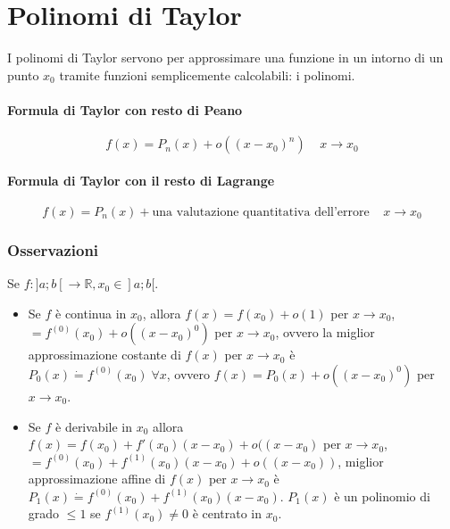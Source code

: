 \chapter{Polinomi di Taylor}
I polinomi di Taylor servono per approssimare una funzione in un intorno di un punto $x_0$ tramite funzioni semplicemente calcolabili: i polinomi.
\subsubsection{Formula di Taylor con resto di Peano}
\begin{equation}
f(x)=P_n(x)+o((x-x_0)^n)\;\;\;\;x\rightarrow x_0
\end{equation}
\subsubsection{Formula di Taylor con il resto di Lagrange}
\begin{equation}
f(x)=P_n(x)+\text{una valutazione quantitativa dell'errore}\;\;\;\;x\rightarrow x_0
\end{equation}
\subsection{Osservazioni}
Se $f:]a;b[\rightarrow\mathbb{R}, x_0\in]a;b[$.
\begin{itemize}
\item Se $f$ \`e continua in $x_0$, allora $f(x)=f(x_0)+o(1)$ per $x\rightarrow x_0$,\\
$=f^{(0)}(x_0)+o((x-x_0)^0)$ per $x\rightarrow x_0$, ovvero la miglior approssimazione costante di $f(x)$ per $x\rightarrow x_0$ \`e\\
$P_0(x)\dot{=}f^{(0)}(x_0)\;\forall x$, ovvero $f(x)=P_0(x)+o((x-x_0)^0)$ per $x\rightarrow x_0$.
\item Se $f$ \`e derivabile in $x_0$ allora $f(x)=f(x_0)+f'(x_0)(x-x_0)+o((x-x_0)$ per $x\rightarrow x_0$, $=f^{(0)}(x_0)+f^{(1)}(x_0)(x-x_0)+o((x-x_0))$, miglior approssimazione 
affine di $f(x)$ per $x\rightarrow x_0$ \`e\\
$P_1(x)\dot{=}f^{(0)}(x_0)+f^{(1)}(x_0)(x-x_0)$. $P_1(x)$ \`e un polinomio di grado $\le 1$ se $f^{(1)}(x_0)\neq 0$ \`e centrato in $x_0$.
\end{itemize}
